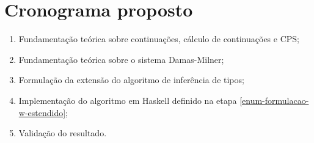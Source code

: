 \documentclass[12pt]{article}
\begin{document}
\section{Cronograma proposto} \label{sec:Cronograma}

\begin{enumerate}
	\item Fundamentação teórica sobre continuações, cálculo de continuações e CPS;
	\item Fundamentação teórica sobre o sistema Damas-Milner;
	\item Formulação da extensão do algoritmo de inferência de tipos; \label{enum-formulacao-w-estendido}
	\item Implementação do algoritmo em Haskell definido na etapa \ref{enum-formulacao-w-estendido};
	\item Validação do resultado.
\end{enumerate}
\end{document}
